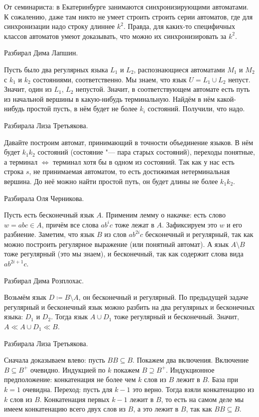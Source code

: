 	\begin{Rem}
		От семинариста: в Екатеринбурге занимаются синхронизирующими автоматами.
		К сожалению, даже там никто не умеет строить строить серии автоматов,
		где для синхронизации надо строку длиннее $k^2$.
		Правда, для каких-то специфичных классов автоматов умеют доказывать, что
		можно их синхронизировать за $k^2$.
	\end{Rem}

	Разбирал Дима Лапшин.

	Пусть было два регулярных языка $L_1$ и $L_2$, распознающиеся автоматами $M_1$ и $M_2$
	с $k_1$ и $k_2$ состояниями, соответственно.
	Мы знаем, что язык $U=L_1\cup L_2$ непуст.
	Значит, один из $L_1$, $L_2$ непустой.
	Значит, в соответствующем автомате есть путь из начальной вершины в какую-нибудь терминальную.
	Найдём в нём какой-нибудь простой пусть, в нём будет не более $k_i$ состояний.
	Получили, что надо.

	Разбирала Лиза Третьякова.

	Давайте построим автомат, принимающий в точности объединение языков.
	В нём будет $k_1k_2$ состояний (состояние "--- пара старых состояний),
	переходы понятные, а терминал $\iff$ терминал хотя бы в одном из состояний.
	Так как у нас есть строка $s$, не принимаемая автоматом, то есть достижимая нетерминальная вершина.
	До неё можно найти простой путь, он будет длины не более $k_1k_2$.

	Разбирала Оля Черникова.

	Пусть есть бесконечный язык $A$.
	Применим лемму о накачке: есть слово $w=abc \in A$, причём все слова $ab^ic$ тоже лежат в $A$.
	Зафиксируем это $w$ и его разбиение.
	Заметим, что язык $B$ из слов $ab^{2i}c$ бесконечный и регулярный, так как можно построить регулярное выражение
	(или понятный автомат).
	А язык $A\setminus B$ тоже регулярный (это мы знаем), и бесконечный, так как содержит слова вида $ab^{2i+1}c$.

	Разбирал Дима Розплохас.

	Возьмём язык $D \coloneq B \setminus A$, он бесконечный и регулярный.
	По предыдущей задаче регулярный и бесконечный язык можно разбить на два регулярных и бесконечных языка: $D_1$ и $D_2$.
	Тогда язык $A \cup D_1$ тоже регулярный и бесконечный.
	Значит, $A \ll A \cup D_1 \ll B$.

	Разбирала Лиза Третьякова.

	Сначала доказываем влево: пусть $BB\subseteq B$.
	Покажем два включения.
	Включение $B\subseteq B^{+}$ очевидно.
	Индукцией по $k$ покажем $B\supseteq B^{+}$.
	Индукционное предположение: конкатенация не более чем $k$ слов из $B$ лежит в $B$.
	База при $k=1$ очевидна.
	Переход: пусть для $k-1$ это верно.
	Тогда взяли конкатенацию из $k$ слов из $B$.
	Конкатенация первых $k-1$ лежит в $B$, то есть на самом деле мы имеем конкатенацию всего
	двух слов из $B$, а это лежит в $B$, так как $BB\subseteq B$.

